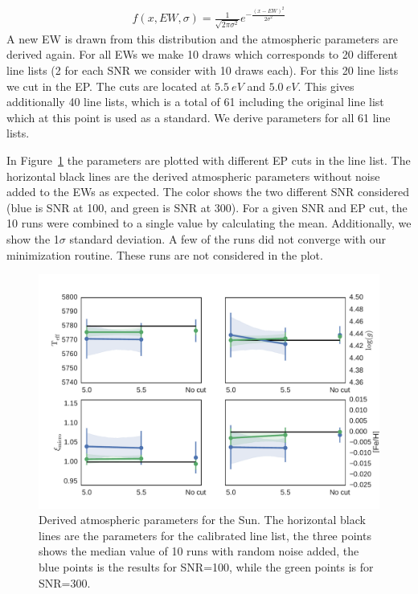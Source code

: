 \documentclass{aa}
\begin{document}
\begin{align}
    f(x, EW, \sigma) = \frac{1}{\sqrt{2\pi\sigma^2}} e^{-\frac{(x-EW)^2}{2\sigma^2}}
\end{align}
A new EW is drawn from this distribution and the atmospheric parameters
are derived again. For all EWs we make 10 draws which corresponds to
20 different line lists (2 for each SNR we consider with 10 draws
each). For this 20 line lists we cut in the EP. The cuts are located
at $\SI{5.5}{eV}$ and $\SI{5.0}{eV}$. This gives additionally 40 line
lists, which is a total of 61 including the original line list which at
this point is used as a standard. We derive parameters for all 61 line
lists.


In Figure~\ref{fig:solar_parameters} the parameters are plotted with
different EP cuts in the line list. The horizontal black lines are
the derived atmospheric parameters without noise added to the EWs as
expected. The color shows the two different SNR considered (blue is
SNR at 100, and green is SNR at 300). For a given SNR and EP cut,
the 10 runs were combined to a single value by calculating the mean.
Additionally, we show the 1$\sigma$ standard deviation. A few of the
runs did not converge with our minimization routine. These runs are not
considered in the plot.

\begin{figure}[t!]
    \centering
    \includegraphics[width=0.9\linewidth]{figures/solar_parameters_10runs.pdf}
    \caption{Derived atmospheric parameters for the Sun. The horizontal
    black lines are the parameters for the calibrated line list, the
    three points shows the median value of 10 runs with random noise
    added, the blue points is the results for SNR=100, while the
    green points is for SNR=300.}
    \label{fig:solar_parameters}
\end{figure}
\end{document}
